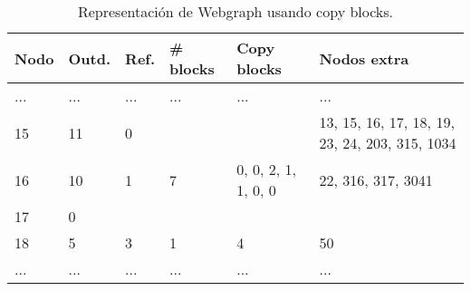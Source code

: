 \begin{table}[t]
\caption{Representación de Webgraph usando copy blocks.}
\label{table:webgraph3}
\centering
\scriptsize

\begin{tabular}{|l|l|l|l|l|l|}
	\toprule
	Nodo & Outd. & Ref. & \# blocks & Copy blocks & Nodos extra \\
	\midrule
	... & ... & ... & ... & ... & ... \\
	15 & 11 & 0 &  &  & 13, 15, 16, 17, 18, 19, 23, 24, 203, 315, 1034 \\
	16 & 10 & 1 & 7 & 0, 0, 2, 1, 1, 0, 0 & 22, 316, 317, 3041 \\
	17 & 0 &  &  &  & \\
	18 & 5 & 3 & 1 & 4 & 50 \\
	... & ... & ... & ... & ... & ... \\
\end{tabular}
\end{table}
